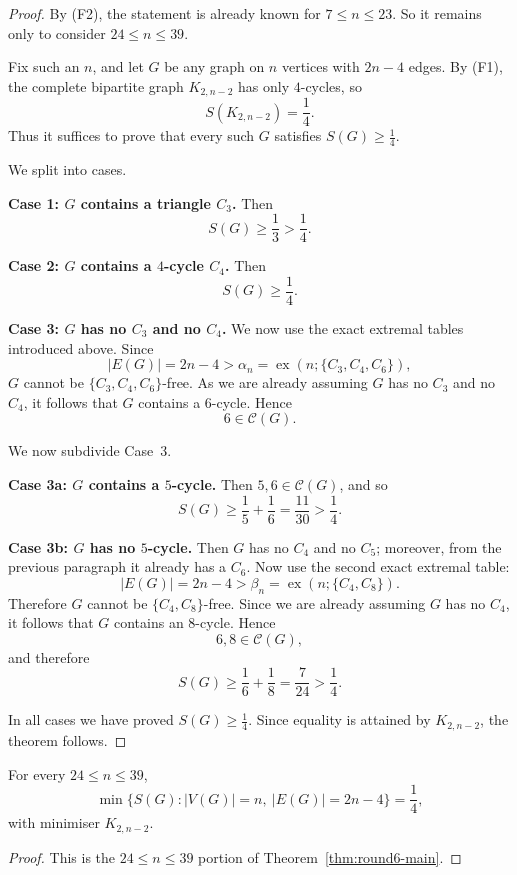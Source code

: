 \begin{proof}
By (F2), the statement is already known for $7\le n\le 23$.
So it remains only to consider $24\le n\le 39$.

Fix such an $n$, and let $G$ be any graph on $n$ vertices with $2n-4$ edges.
By (F1), the complete bipartite graph $K_{2,n-2}$ has only $4$-cycles, so
\[
S(K_{2,n-2})=\frac14.
\]
Thus it suffices to prove that every such $G$ satisfies $S(G)\ge \frac14$.

We split into cases.

\smallskip
\noindent\textbf{Case 1: $G$ contains a triangle $C_3$.}
Then
\[
S(G)\ge \frac13>\frac14.
\]

\smallskip
\noindent\textbf{Case 2: $G$ contains a $4$-cycle $C_4$.}
Then
\[
S(G)\ge \frac14.
\]

\smallskip
\noindent\textbf{Case 3: $G$ has no $C_3$ and no $C_4$.}
We now use the exact extremal tables introduced above.
Since
\[
|E(G)|=2n-4>\alpha_n=\operatorname{ex}(n;\{C_3,C_4,C_6\}),
\]
$G$ cannot be $\{C_3,C_4,C_6\}$-free. As we are already assuming $G$ has no $C_3$ and no $C_4$, it follows that $G$ contains a $6$-cycle. Hence
\[
6\in\mathcal C(G).
\]

We now subdivide Case~3.

\smallskip
\noindent\textbf{Case 3a: $G$ contains a $5$-cycle.}
Then $5,6\in\mathcal C(G)$, and so
\[
S(G)\ge \frac15+\frac16=\frac{11}{30}>\frac14.
\]

\smallskip
\noindent\textbf{Case 3b: $G$ has no $5$-cycle.}
Then $G$ has no $C_4$ and no $C_5$; moreover, from the previous paragraph it already has a $C_6$.
Now use the second exact extremal table:
\[
|E(G)|=2n-4>\beta_n=\operatorname{ex}(n;\{C_4,C_8\}).
\]
Therefore $G$ cannot be $\{C_4,C_8\}$-free. Since we are already assuming $G$ has no $C_4$, it follows that $G$ contains an $8$-cycle. Hence
\[
6,8\in\mathcal C(G),
\]
and therefore
\[
S(G)\ge \frac16+\frac18=\frac7{24}>\frac14.
\]

In all cases we have proved $S(G)\ge \frac14$.
Since equality is attained by $K_{2,n-2}$, the theorem follows.
\end{proof}

\begin{corollary}[New exact range on the $a=2$ complete-bipartite line]
For every $24\le n\le 39$,
\[
\min\{S(G): |V(G)|=n,\ |E(G)|=2n-4\}=\frac14,
\]
with minimiser $K_{2,n-2}$.
\end{corollary}

\begin{proof}
This is the $24\le n\le 39$ portion of Theorem~\ref{thm:round6-main}.
\end{proof}


